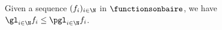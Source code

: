 %
%

\begin{fact}\label{GluinglowerthanPgluing}
Given a sequence $(f_i)_{i\in \N}$ in $\functionsonbaire$,
we have $\gl_{i\in \N} f_i\leq \pgl_{i\in \N} f_i$.
\end{fact}

